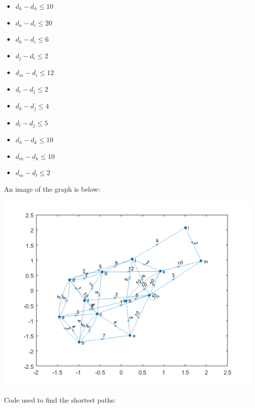 \documentclass[../report/main.tex]{subfiles}
\begin{document}
\begin{enumerate}[a)]
\begin{itemize}
      \item $d_k - d_h \leq 10$
      \item $d_a - d_i \leq 20$
      \item $d_k - d_i \leq 6$
      \item $d_j - d_i \leq 2$
      \item $d_m - d_i \leq 12$
      \item $d_i - d_j \leq 2$
      \item $d_k - d_j \leq 4$
      \item $d_l - d_j \leq 5$
      \item $d_h - d_k \leq 10$
      \item $d_m - d_k \leq 10$
      \item $d_m - d_l \leq 2$
    \end{itemize}

    An image of the graph is below:

    \includegraphics{../problem_three/img/problem3_digraph.png}

    Code used to find the shortest paths:
  
    


\end{enumerate}
\end{document}
